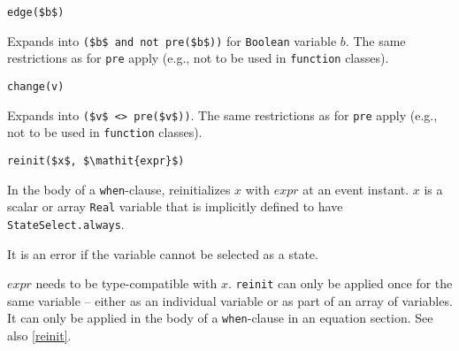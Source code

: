 \begin{operatordefinition}[edge]
\begin{synopsis}\begin{lstlisting}
edge($b$)
\end{lstlisting}\end{synopsis}
\begin{semantics}
Expands into \lstinline!($b$ and not pre($b$))! for \lstinline!Boolean! variable $b$.
The same restrictions as for \lstinline!pre! apply (e.g., not to be used in \lstinline!function! classes).
\end{semantics}
\end{operatordefinition}

\begin{operatordefinition}[change]
\begin{synopsis}\begin{lstlisting}
change(v)
\end{lstlisting}\end{synopsis}
\begin{semantics}
Expands into \lstinline!($v$ <> pre($v$))!.
The same restrictions as for \lstinline!pre! apply (e.g., not to be used in \lstinline!function! classes).
\end{semantics}
\end{operatordefinition}

\begin{operatordefinition}[reinit]
\begin{synopsis}\begin{lstlisting}
reinit($x$, $\mathit{expr}$)
\end{lstlisting}\end{synopsis}
\begin{semantics}
In the body of a \lstinline!when!-clause, reinitializes $x$ with $\mathit{expr}$ at an event instant.
$x$ is a scalar or array \lstinline!Real! variable that is implicitly defined to have \lstinline!StateSelect.always!.
\begin{nonnormative}
It is an error if the variable cannot be selected as a state.
\end{nonnormative}
$\mathit{expr}$ needs to be type-compatible with $x$.
\lstinline!reinit! can only be applied once for the same variable -- either as an individual variable or as part of an array of variables.
It can only be applied in the body of a \lstinline!when!-clause in an equation section.
See also \cref{reinit}.
\end{semantics}
\end{operatordefinition}

